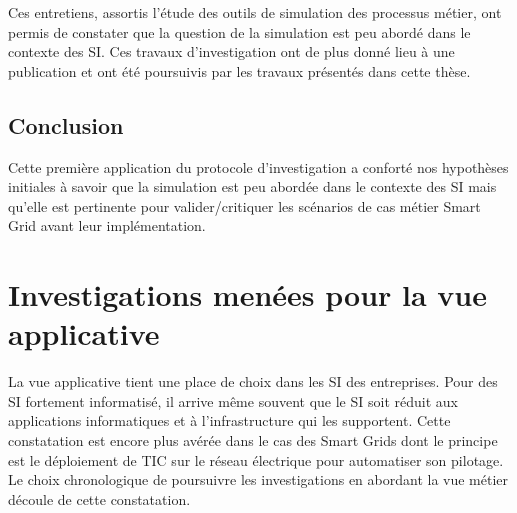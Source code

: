 			Ces entretiens, assortis l'étude des outils de simulation des processus 
métier, ont permis de constater que la question de la simulation est peu abordé 
dans le contexte des SI. Ces travaux d'investigation ont de plus donné lieu à 
une publication \cite{seghiri2012animation} et ont été poursuivis par les 
travaux présentés dans cette thèse.
 
				\subsection{Conclusion}
			Cette première application du protocole d'investigation a conforté nos hypothèses initiales à savoir que la simulation est peu abordée dans le contexte des SI mais qu'elle est pertinente pour valider/critiquer les scénarios de cas métier Smart Grid avant leur implémentation.

	\section{Investigations menées pour la vue applicative} 
	\label{sec:investig_appli}
				La vue applicative tient une place de choix dans les SI des entreprises. Pour des SI fortement informatisé, il arrive même souvent que le SI soit réduit aux applications informatiques et à l'infrastructure qui les supportent. Cette constatation est encore plus avérée dans le cas des Smart Grids dont le principe est le déploiement de TIC sur le réseau électrique pour automatiser son pilotage. Le choix chronologique de poursuivre les investigations en abordant la vue métier découle de cette constatation.		
			
